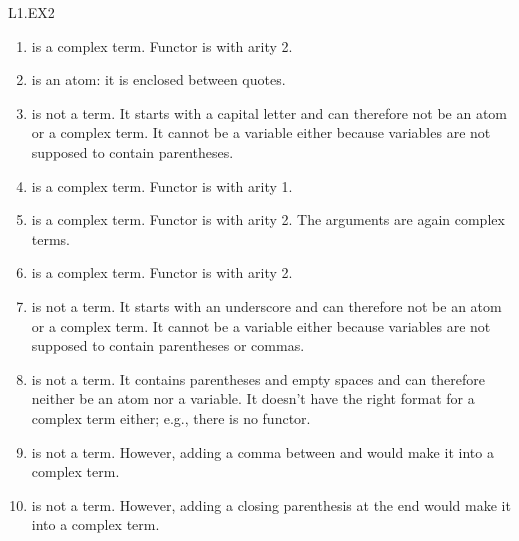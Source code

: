 \begin{mozartANSWER}{L1.EX2}\begin{enumerate}
\item{} is a complex term. Functor is  with arity 2.
\item{} is an atom: it is enclosed between quotes.
\item{} is not a term. It starts with a capital \mozartEMPTY
letter and can therefore not be an atom or a complex term. It cannot \mozartEMPTY
be a variable either because variables are not supposed to contain parentheses.
\item{} is a complex term. Functor is  \mozartEMPTY
with arity 1.
\item{} is a complex \mozartEMPTY
term. Functor is  with arity 2. The arguments are again \mozartEMPTY
complex terms.
\item{} is a complex term. Functor is \mozartEMPTY
{} with arity 2.
\item{} is not a term. It starts with an \mozartEMPTY
underscore and can therefore not be an atom or a complex term. It cannot \mozartEMPTY
be a variable either because variables are not supposed to contain \mozartEMPTY
parentheses or commas.
\item{} is not a term. It contains \mozartEMPTY
parentheses and empty spaces and can therefore neither be an atom nor a \mozartEMPTY
variable. It doesn't have the right format for a complex term either; \mozartEMPTY
e.g., there is no functor.
\item{} is not a term. However, adding a comma \mozartEMPTY
between  and  would make it into a complex term.
\item{} is not a term. However, adding a \mozartEMPTY
closing parenthesis at the end would make it into a complex term.
\end{enumerate}
\end{mozartANSWER}
